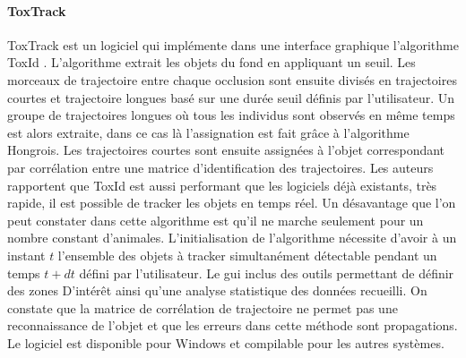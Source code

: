  \paragraph{ToxTrack}
  ToxTrack \cite{rodriguez2018toxtrac} est un logiciel qui implémente dans une interface graphique l'algorithme ToxId \cite{rodriguez2017toxid}. L’algorithme extrait les objets du fond en appliquant un seuil. Les morceaux de trajectoire entre chaque occlusion sont ensuite divisés en trajectoires courtes et  trajectoire longues basé sur une durée seuil définis par l'utilisateur. Un groupe de trajectoires longues où tous les individus sont observés en même temps est alors extraite, dans ce cas là l'assignation est fait grâce à l'algorithme Hongrois. Les trajectoires courtes sont ensuite assignées à l'objet correspondant par corrélation entre une matrice d'identification des trajectoires.
  Les auteurs rapportent que ToxId est aussi performant que les logiciels déjà existants, très rapide, il est possible de tracker les objets en temps réel. Un désavantage que l'on peut constater dans cette algorithme est qu'il ne marche seulement pour un nombre constant d'animales. L'initialisation de l'algorithme nécessite d'avoir à un instant $t$ l'ensemble des objets à tracker simultanément détectable pendant un temps $t+dt$ défini par l'utilisateur. Le gui inclus des outils permettant de définir des zones D’intérêt ainsi qu'une analyse statistique des données recueilli. On constate que la matrice de corrélation de trajectoire ne permet pas une reconnaissance de l'objet et que les erreurs dans cette méthode sont propagations. Le logiciel est disponible pour Windows et compilable pour les autres systèmes.

